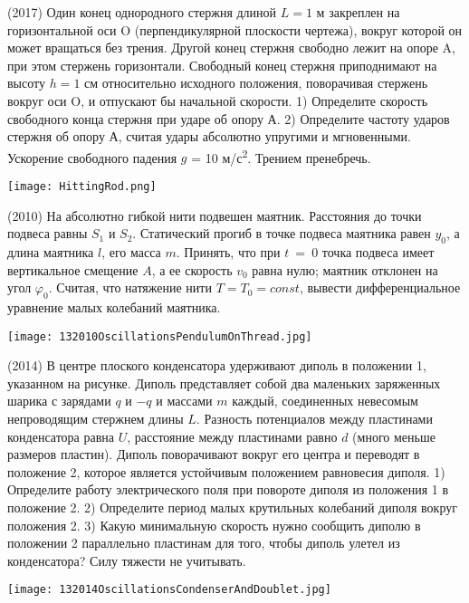 \begin{ex}
(2017) Один конец однородного стержня длиной $L=1$ м закреплен на горизонтальной оси O (перпендикулярной плоскости чертежа), вокруг которой он может вращаться без трения. Другой конец стержня свободно лежит на опоре A, при этом стержень горизонтали. Свободный конец стержня приподнимают на высоту $h = 1$ см относительно исходного положения, поворачивая стержень
вокруг оси O, и отпускают бы начальной скорости. 1) Определите скорость
свободного конца стержня при ударе об опору А. 2) Определите частоту ударов
стержня об опору А, считая удары абсолютно упругими и мгновенными.
Ускорение свободного падения $g$ = 10 м/с\textsuperscript{2}. Трением пренебречь.
\begin{center}
\texttt{[image: HittingRod.png]}
\end{center}
\begin{ans}
\end{ans}
\end{ex}

\begin{ex}
(2010) На абсолютно гибкой нити подвешен маятник. Расстояния до точки подвеса равны $S_1$ и $S_2$. 
Статический прогиб в точке подвеса маятника равен $y_0$, а длина маятника $l$, его масса $m$. 
Принять, что при $t$~=~0 точка подвеса имеет вертикальное смещение $A$, а ее скорость $v_0$ равна нулю; маятник отклонен на угол $\varphi_0$. 
Считая, что натяжение нити $T = T_0 = const$, вывести дифференциальное уравнение малых колебаний маятника.
\begin{center}
\texttt{[image: 132010OscillationsPendulumOnThread.jpg]}
\end{center}
\begin{ans}
\end{ans}
\end{ex}

\begin{ex}
(2014) В центре плоского конденсатора удерживают диполь в положении 1, указанном на рисунке. 
Диполь представляет собой два маленьких заряженных шарика с зарядами $q$ и $-q$ и массами $m$ каждый, 
соединенных невесомым непроводящим стержнем длины $L$. Разность потенциалов между пластинами конденсатора равна $U$, 
расстояние между пластинами равно $d$ (много меньше размеров пластин). Диполь поворачивают вокруг его центра и переводят в положение 2, 
которое является устойчивым положением равновесия диполя. 
1) Определите работу электрического поля при повороте диполя из положения 1 в положение 2. 
2) Определите период малых крутильных колебаний диполя вокруг положения 2. 
3) Какую минимальную скорость нужно сообщить диполю в положении 2 параллельно пластинам для того, чтобы диполь улетел из конденсатора? 
Силу тяжести не учитывать.
\begin{center}
\texttt{[image: 132014OscillationsCondenserAndDoublet.jpg]}
\end{center}
\begin{ans}
\end{ans}
\end{ex}

